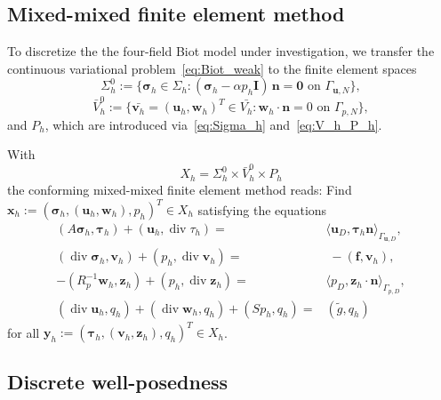 \documentclass[11pt]{amsart}
\theoremstyle{remark}
\theoremstyle{definition}
\def\sig{{\bm \sigma}}
\def\bu{{\boldsymbol u}}
\def\bv{{\boldsymbol v}}
\def\bw{{\boldsymbol w}}
\def\bff{{\boldsymbol f}}
\renewcommand{\div}{\operatorname{div}}
\renewcommand{\div}{\operatorname{div}}
\def\sig{\boldsymbol \sigma}
\def\bu{\boldsymbol u}
\def\bv{\boldsymbol v}
\def\bw{\boldsymbol w}
\def\bx{\boldsymbol x}
\def\by{\boldsymbol y}
\def\bz{\boldsymbol z}
\def\bn{\boldsymbol n}
\begin{document}
\subsection{Mixed-mixed finite element method}\label{subsec:mixed_mixed_fem}

To discretize the the four-field Biot model under investigation, we transfer the continuous variational problem~\eqref{eq:Biot_weak} to the finite element spaces
$$
\Sigma_h^0 := \{ \sig_h \in \Sigma_h: (\sig_h -\alpha p_h  \boldsymbol I) \, \bn = \bm 0 \text{ on }\Gamma_{\bu,N}\},
$$
$$
\bar{V}_h^0 := \{ \bar{\bv_h} = (\bu_h,\bw_h)^T  \in \bar{V_h}: \bw_h \cdot \bn = 0 \text{ on }\Gamma_{p,N} \},
$$
and $P_h$, which are introduced via~\eqref{eq:Sigma_h} and~\eqref{eq:V_h_P_h}.

With
%
\begin{equation}\label{eq:X_h}
X_h = \Sigma_h^0 \times \bar{V}_h^0 \times P_h
\end{equation}
%
the conforming mixed-mixed finite element method reads: Find
%
$\bx_h := (\sig_h,(\bu_h,\bw_h),p_h)^T \in X_h$ satisfying the equations
\begin{subequations}\label{eq:Biot_fem}
\begin{align}   
(A \sig_h, \bm \tau_h) + (\bu_h,\div \tau_h) = &  \langle \bu_D, 
\bm \tau_h \bn \rangle_{\Gamma_{\bu,D}}, \label{eq:Biot_fem1}\\
%
(\div \sig_h,\bv_h) + (p_h, \div \bv_h) = & \; -(\bff,\bv_h),  \label{eq:Biot_fem2}\\  
%
- (R_p^{-1}  \bw_h, \bz_h) + (p_h,\div \bz_h) = &
\langle p_{D}, \bz_h \cdot \bn \rangle_{\Gamma_{p,D}}, \label{eq:Biot_fem3} \\ 
%
(\div \bu_h, q_h) + (\div \bw_h, q_h) + (S p_h,q_h) = & (\tilde{g},q_h) \label{eq:Biot_fem4} 
\end{align}
\end{subequations}
for all $\by_h := (\bm \tau_h,(\bv_h,\bz_h),q_h)^T \in X_h$.

\subsection{Discrete well-posedness}\label{subsec:fem_stability_estimate} 
\end{document}
